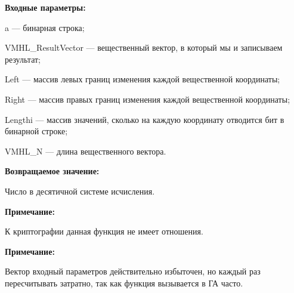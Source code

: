 \textbf{Входные параметры:}
 
a --- бинарная строка;
 
VMHL\_ResultVector --- вещественный вектор, в который мы и записываем результат;
 
Left --- массив левых границ изменения каждой вещественной координаты;
 
Right --- массив правых границ изменения каждой вещественной координаты;
 
Lengthi --- массив значений, сколько на каждую координату отводится бит в бинарной строке;
 
VMHL\_N --- длина вещественного вектора.

\textbf{Возвращаемое значение:}
 
Число в десятичной системе исчисления.

\textbf{Примечание:}

 К криптографии данная функция не имеет отношения.
 
\textbf{Примечание:}

 Вектор входный параметров действительно избыточен, но каждый раз пересчитывать затратно, так как функция вызывается в ГА часто.